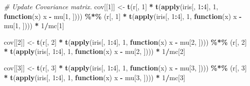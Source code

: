 \documentclass[12pt]{article}
\newenvironment{Shaded}{\begin{snugshade}}{\end{snugshade}}
\newcommand{\CommentTok}[1]{\textcolor[rgb]{0.56,0.35,0.01}{\textit{#1}}}
\newcommand{\ControlFlowTok}[1]{\textcolor[rgb]{0.13,0.29,0.53}{\textbf{#1}}}
\newcommand{\DecValTok}[1]{\textcolor[rgb]{0.00,0.00,0.81}{#1}}
\newcommand{\FunctionTok}[1]{\textcolor[rgb]{0.13,0.29,0.53}{\textbf{#1}}}
\newcommand{\NormalTok}[1]{#1}
\newcommand{\OtherTok}[1]{\textcolor[rgb]{0.56,0.35,0.01}{#1}}
\newcommand{\SpecialCharTok}[1]{\textcolor[rgb]{0.81,0.36,0.00}{\textbf{#1}}}
\begin{document}
\begin{Shaded}
\begin{Highlighting}[]
\CommentTok{\# Update Covariance matrix.}
\NormalTok{cov[[}\DecValTok{1}\NormalTok{]] }\OtherTok{\textless{}{-}} \FunctionTok{t}\NormalTok{(r[, }\DecValTok{1}\NormalTok{] }\SpecialCharTok{*} \FunctionTok{t}\NormalTok{(}\FunctionTok{apply}\NormalTok{(iris[, }\DecValTok{1}\SpecialCharTok{:}\DecValTok{4}\NormalTok{], }\DecValTok{1}\NormalTok{, }\ControlFlowTok{function}\NormalTok{(x) x }\SpecialCharTok{{-}}\NormalTok{ mu[}\DecValTok{1}\NormalTok{, ]))) }\SpecialCharTok{\%*\%} 
\NormalTok{    (r[, }\DecValTok{1}\NormalTok{] }\SpecialCharTok{*} \FunctionTok{t}\NormalTok{(}\FunctionTok{apply}\NormalTok{(iris[, }\DecValTok{1}\SpecialCharTok{:}\DecValTok{4}\NormalTok{], }\DecValTok{1}\NormalTok{, }\ControlFlowTok{function}\NormalTok{(x) x }\SpecialCharTok{{-}}\NormalTok{ mu[}\DecValTok{1}\NormalTok{, ]))) }\SpecialCharTok{*} \DecValTok{1}\SpecialCharTok{/}\NormalTok{mc[}\DecValTok{1}\NormalTok{]}

\NormalTok{cov[[}\DecValTok{2}\NormalTok{]] }\OtherTok{\textless{}{-}} \FunctionTok{t}\NormalTok{(r[, }\DecValTok{2}\NormalTok{] }\SpecialCharTok{*} \FunctionTok{t}\NormalTok{(}\FunctionTok{apply}\NormalTok{(iris[, }\DecValTok{1}\SpecialCharTok{:}\DecValTok{4}\NormalTok{], }\DecValTok{1}\NormalTok{, }\ControlFlowTok{function}\NormalTok{(x) x }\SpecialCharTok{{-}}\NormalTok{ mu[}\DecValTok{2}\NormalTok{, ]))) }\SpecialCharTok{\%*\%} 
\NormalTok{    (r[, }\DecValTok{2}\NormalTok{] }\SpecialCharTok{*} \FunctionTok{t}\NormalTok{(}\FunctionTok{apply}\NormalTok{(iris[, }\DecValTok{1}\SpecialCharTok{:}\DecValTok{4}\NormalTok{], }\DecValTok{1}\NormalTok{, }\ControlFlowTok{function}\NormalTok{(x) x }\SpecialCharTok{{-}}\NormalTok{ mu[}\DecValTok{2}\NormalTok{, ]))) }\SpecialCharTok{*} \DecValTok{1}\SpecialCharTok{/}\NormalTok{mc[}\DecValTok{2}\NormalTok{]}

\NormalTok{cov[[}\DecValTok{3}\NormalTok{]] }\OtherTok{\textless{}{-}} \FunctionTok{t}\NormalTok{(r[, }\DecValTok{3}\NormalTok{] }\SpecialCharTok{*} \FunctionTok{t}\NormalTok{(}\FunctionTok{apply}\NormalTok{(iris[, }\DecValTok{1}\SpecialCharTok{:}\DecValTok{4}\NormalTok{], }\DecValTok{1}\NormalTok{, }\ControlFlowTok{function}\NormalTok{(x) x }\SpecialCharTok{{-}}\NormalTok{ mu[}\DecValTok{3}\NormalTok{, ]))) }\SpecialCharTok{\%*\%} 
\NormalTok{    (r[, }\DecValTok{3}\NormalTok{] }\SpecialCharTok{*} \FunctionTok{t}\NormalTok{(}\FunctionTok{apply}\NormalTok{(iris[, }\DecValTok{1}\SpecialCharTok{:}\DecValTok{4}\NormalTok{], }\DecValTok{1}\NormalTok{, }\ControlFlowTok{function}\NormalTok{(x) x }\SpecialCharTok{{-}}\NormalTok{ mu[}\DecValTok{3}\NormalTok{, ]))) }\SpecialCharTok{*} \DecValTok{1}\SpecialCharTok{/}\NormalTok{mc[}\DecValTok{3}\NormalTok{]}


\end{Highlighting}
\end{Shaded}
\end{document}
